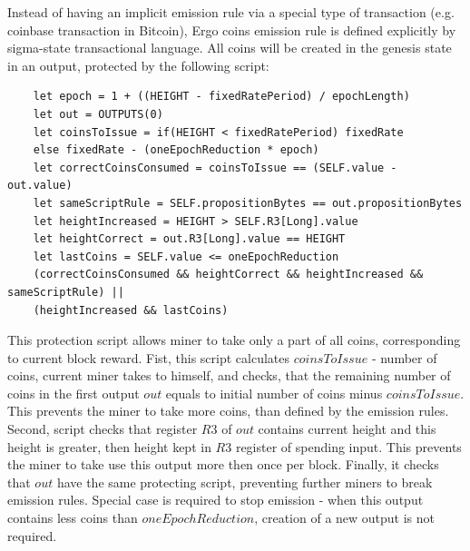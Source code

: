 Instead of having an implicit emission rule via a special type of transaction (e.g. coinbase transaction in Bitcoin),
Ergo coins emission rule is defined explicitly by sigma-state transactional language.
All \ergo{} coins will be created in the genesis state in an output, protected by the following script:

\begin{verbatim}
    let epoch = 1 + ((HEIGHT - fixedRatePeriod) / epochLength)
    let out = OUTPUTS(0)
    let coinsToIssue = if(HEIGHT < fixedRatePeriod) fixedRate
    else fixedRate - (oneEpochReduction * epoch)
    let correctCoinsConsumed = coinsToIssue == (SELF.value - out.value)
    let sameScriptRule = SELF.propositionBytes == out.propositionBytes
    let heightIncreased = HEIGHT > SELF.R3[Long].value
    let heightCorrect = out.R3[Long].value == HEIGHT
    let lastCoins = SELF.value <= oneEpochReduction
    (correctCoinsConsumed && heightCorrect && heightIncreased && sameScriptRule) ||
    (heightIncreased && lastCoins)
\end{verbatim}

This protection script allows miner to take only a part of all coins, corresponding to current block reward.
Fist, this script calculates $coinsToIssue$ - number of coins, current miner takes to himself,
and checks, that the remaining  number of coins in the first output $out$ equals to initial
number of coins minus $coinsToIssue$.
This prevents the miner to take more coins, than defined by the emission rules.
Second, script checks that register $R3$ of $out$ contains current height and this height is greater, then height
kept in $R3$ register of spending input.
This prevents the miner to take use this output more then once per block.
Finally, it checks that $out$ have the same protecting script, preventing further miners to break emission rules.
Special case is required to stop emission - when this output contains less coins than $oneEpochReduction$,
creation of a new output is not required.
